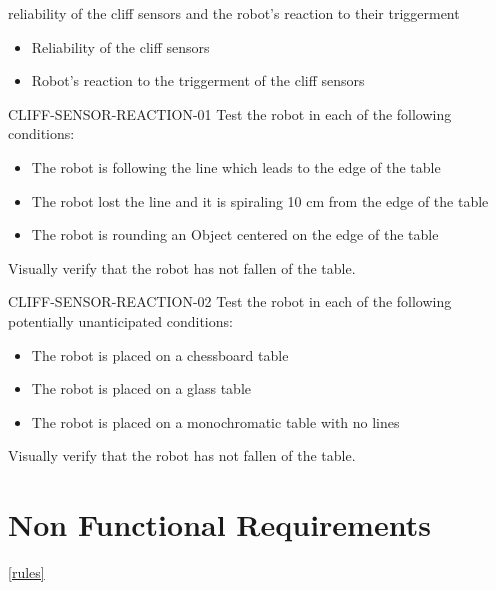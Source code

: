 \begin{itemize}
        {reliability of the cliff sensors and the robot's reaction to their triggerment}
        {
            \begin{itemize}
                \item Reliability of the cliff sensors
                \item Robot's reaction to the triggerment of the cliff sensors
            \end{itemize}
        }
        {
            \item CLIFF-SENSOR-REACTION-01 \quad Test the robot in each of the following conditions:
            \begin{itemize}
                \item The robot is following the line which leads to the edge of the table
                \item The robot lost the line and it is spiraling 10 cm from the edge of the table
                \item The robot is rounding an Object centered on the edge of the table
            \end{itemize}
            Visually verify that the robot has not fallen of the table.
            \item CLIFF-SENSOR-REACTION-02 \quad Test the robot in each of the following potentially unanticipated conditions:
            \begin{itemize}
                \item The robot is placed on a chessboard table
                \item The robot is placed on a glass table
                \item The robot is placed on a monochromatic table with no lines
            \end{itemize}
            Visually verify that the robot has not fallen of the table.
        }
\end{itemize}

\section{Non Functional Requirements}
\ref{rules}






